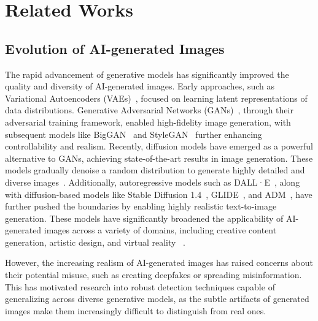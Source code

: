\section{Related Works}

\subsection{Evolution of AI-generated Images}
The rapid advancement of generative models has significantly improved the quality and diversity of AI-generated images.
Early approaches, such as Variational Autoencoders (VAEs)~\cite{kingma2013auto}, focused on learning latent representations of data distributions. 
Generative Adversarial Networks (GANs)~\cite{goodfellow2014generative}, through their adversarial training framework, enabled high-fidelity image generation, with subsequent models like BigGAN~\cite{brock2018large} and StyleGAN~\cite{karras2019style} further enhancing controllability and realism.
Recently, diffusion models \cite{ho2020denoising} have emerged as a powerful alternative to GANs, achieving state-of-the-art results in image generation. These models gradually denoise a random distribution to generate highly detailed and diverse images~\cite{corvi2023detection}.
Additionally, autoregressive models such as DALL·E~\cite{ramesh2022hierarchical}, along with diffusion-based models like Stable Diffusion 1.4~\cite{rombach2022high}, GLIDE~\cite{nichol2021glide}, and ADM~\cite{dhariwal2021diffusion}, have further pushed the boundaries by enabling highly realistic text-to-image generation. These models have significantly broadened the applicability of AI-generated images across a variety of domains, including creative content generation, artistic design, and virtual reality ~\cite{gu2022vector,ricker2022towards}.

However, the increasing realism of AI-generated images has raised concerns about their potential misuse, such as creating deepfakes or spreading misinformation. This has motivated research into robust detection techniques capable of generalizing across diverse generative models, as the subtle artifacts of generated images make them increasingly difficult to distinguish from real ones.

